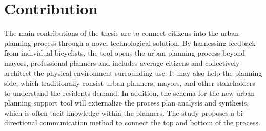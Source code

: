 \section{Contribution}
The main contributions of the thesis are to connect citizens into the urban planning process through a novel technological solution. By harnessing feedback from individual bicyclists, the tool opens the urban planning process beyond mayors, professional planners and includes average citizens and collectively architect the physical environment surrounding use.
It may also help the planning side, which traditionally consist urban planners, mayors, and other stakeholders to understand the residents demand. In addition, the schema for the new urban planning support tool will externalize the process plan analysis and synthesis, which is often tacit knowledge within the planners.
The study proposes a bi-directional communication method to connect the top and bottom of the process.
